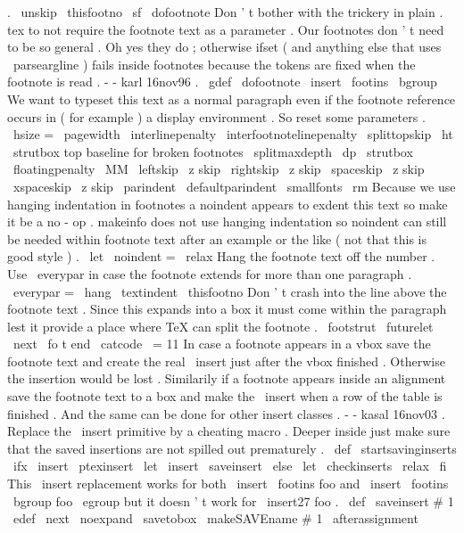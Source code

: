 {{{.
\
unskip
\
thisfootno
\
sf
\
dofootnote
}
%
%
Don
'
t
bother
with
the
trickery
in
plain
.
tex
to
not
require
the
%
footnote
text
as
a
parameter
.
Our
footnotes
don
'
t
need
to
be
so
general
.
%
%
Oh
yes
they
do
;
otherwise
ifset
(
and
anything
else
that
uses
%
\
parseargline
)
fails
inside
footnotes
because
the
tokens
are
fixed
when
%
the
footnote
is
read
.
-
-
karl
16nov96
.
%
\
gdef
\
dofootnote
{
%
\
insert
\
footins
\
bgroup
%
We
want
to
typeset
this
text
as
a
normal
paragraph
even
if
the
%
footnote
reference
occurs
in
(
for
example
)
a
display
environment
.
%
So
reset
some
parameters
.
\
hsize
=
\
pagewidth
\
interlinepenalty
\
interfootnotelinepenalty
\
splittopskip
\
ht
\
strutbox
%
top
baseline
for
broken
footnotes
\
splitmaxdepth
\
dp
\
strutbox
\
floatingpenalty
\
MM
\
leftskip
\
z
skip
\
rightskip
\
z
skip
\
spaceskip
\
z
skip
\
xspaceskip
\
z
skip
\
parindent
\
defaultparindent
%
\
smallfonts
\
rm
%
%
Because
we
use
hanging
indentation
in
footnotes
a
noindent
appears
%
to
exdent
this
text
so
make
it
be
a
no
-
op
.
makeinfo
does
not
use
%
hanging
indentation
so
noindent
can
still
be
needed
within
footnote
%
text
after
an
example
or
the
like
(
not
that
this
is
good
style
)
.
\
let
\
noindent
=
\
relax
%
%
Hang
the
footnote
text
off
the
number
.
Use
\
everypar
in
case
the
%
footnote
extends
for
more
than
one
paragraph
.
\
everypar
=
{
\
hang
}
%
\
textindent
{
\
thisfootno
}
%
%
%
Don
'
t
crash
into
the
line
above
the
footnote
text
.
Since
this
%
expands
into
a
box
it
must
come
within
the
paragraph
lest
it
%
provide
a
place
where
TeX
can
split
the
footnote
.
\
footstrut
\
futurelet
\
next
\
fo
t
}
}
%
end
\
catcode
\
=
11
%
In
case
a
footnote
appears
in
a
vbox
save
the
footnote
text
and
create
%
the
real
\
insert
just
after
the
vbox
finished
.
Otherwise
the
insertion
%
would
be
lost
.
%
Similarily
if
a
footnote
appears
inside
an
alignment
save
the
footnote
%
text
to
a
box
and
make
the
\
insert
when
a
row
of
the
table
is
finished
.
%
And
the
same
can
be
done
for
other
insert
classes
.
-
-
kasal
16nov03
.
%
Replace
the
\
insert
primitive
by
a
cheating
macro
.
%
Deeper
inside
just
make
sure
that
the
saved
insertions
are
not
spilled
%
out
prematurely
.
%
\
def
\
startsavinginserts
{
%
\
ifx
\
insert
\
ptexinsert
\
let
\
insert
\
saveinsert
\
else
\
let
\
checkinserts
\
relax
\
fi
}
%
This
\
insert
replacement
works
for
both
\
insert
\
footins
{
foo
}
and
%
\
insert
\
footins
\
bgroup
foo
\
egroup
but
it
doesn
'
t
work
for
\
insert27
{
foo
}
.
%
\
def
\
saveinsert
#
1
{
%
\
edef
\
next
{
\
noexpand
\
savetobox
\
makeSAVEname
#
1
}
%
\
afterassignment
}}
